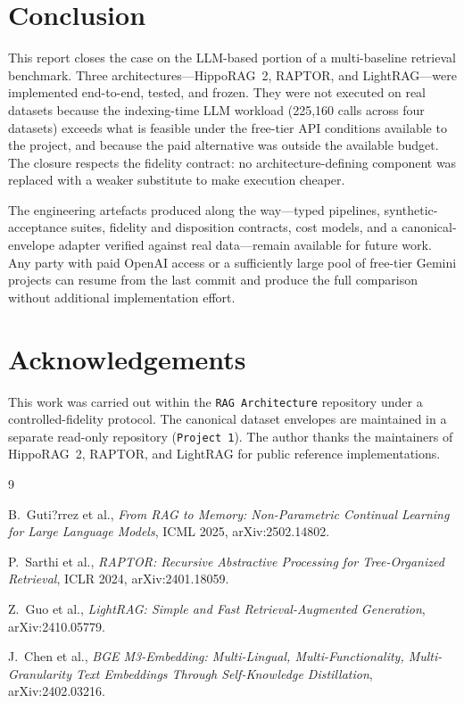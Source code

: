 \documentclass[11pt,a4paper]{article}
\begin{document}
\section{Conclusion}
\label{sec:conclusion}

This report closes the case on the LLM-based portion of a multi-baseline retrieval benchmark. Three architectures---HippoRAG~2, RAPTOR, and LightRAG---were implemented end-to-end, tested, and frozen. They were not executed on real datasets because the indexing-time LLM workload (225{,}160 calls across four datasets) exceeds what is feasible under the free-tier API conditions available to the project, and because the paid alternative was outside the available budget. The closure respects the fidelity contract: no architecture-defining component was replaced with a weaker substitute to make execution cheaper.

The engineering artefacts produced along the way---typed pipelines, synthetic-acceptance suites, fidelity and disposition contracts, cost models, and a canonical-envelope adapter verified against real data---remain available for future work. Any party with paid OpenAI access or a sufficiently large pool of free-tier Gemini projects can resume from the last commit and produce the full comparison without additional implementation effort.

\section*{Acknowledgements}

This work was carried out within the \texttt{RAG Architecture} repository under a controlled-fidelity protocol. The canonical dataset envelopes are maintained in a separate read-only repository (\texttt{Project~1}). The author thanks the maintainers of HippoRAG~2, RAPTOR, and LightRAG for public reference implementations.

\begin{thebibliography}{9}

B.~Guti?rrez et al.,
\emph{From RAG to Memory: Non-Parametric Continual Learning for Large Language Models},
ICML 2025, arXiv:2502.14802.

P.~Sarthi et al.,
\emph{RAPTOR: Recursive Abstractive Processing for Tree-Organized Retrieval},
ICLR 2024, arXiv:2401.18059.

Z.~Guo et al.,
\emph{LightRAG: Simple and Fast Retrieval-Augmented Generation},
arXiv:2410.05779.

J.~Chen et al.,
\emph{BGE M3-Embedding: Multi-Lingual, Multi-Functionality, Multi-Granularity Text Embeddings Through Self-Knowledge Distillation},
arXiv:2402.03216.

\end{thebibliography}
\end{document}
